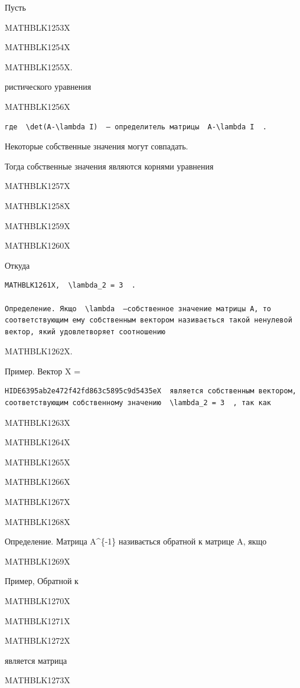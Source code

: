 \documentclass[
  ukrainian,
]{article}
\begin{document}
Пусть

MATHBLK1253X

MATHBLK1254X

MATHBLK1255X.

ристического уравнения

MATHBLK1256X

\begin{verbatim}
где  \det(A-\lambda I)  — определитель матрицы  A-\lambda I  .
\end{verbatim}

Некоторые собственные значения могут совпадать.

Тогда собственные значения являются корнями уравнения

MATHBLK1257X

MATHBLK1258X

MATHBLK1259X

MATHBLK1260X

Откуда

\begin{verbatim}
MATHBLK1261X,  \lambda_2 = 3  .

Определение. Якщо  \lambda  —собственное значение матрицы A, то соответствующим ему собственным вектором називається такой ненулевой вектор, який удовлетворяет соотношению
\end{verbatim}

MATHBLK1262X.

Пример. Вектор X =

\begin{verbatim}
HIDE6395ab2e472f42fd863c5895c9d5435eX  является собственным вектором, соответствующим собственному значению  \lambda_2 = 3  , так как
\end{verbatim}

MATHBLK1263X

MATHBLK1264X

MATHBLK1265X

MATHBLK1266X

MATHBLK1267X

MATHBLK1268X

Определение. Матрица A\^{}\{-1\} називається обратной к матрице A, якщо

MATHBLK1269X

Пример, Обратной к

MATHBLK1270X

MATHBLK1271X

MATHBLK1272X

является матрица

MATHBLK1273X
\end{document}
